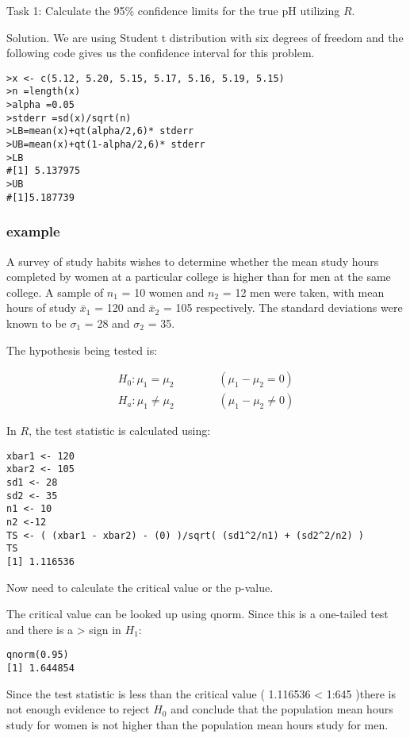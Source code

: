 \documentclass[12pt, a4paper]{report}
\theoremstyle{plain}
\theoremstyle{definition}
\theoremstyle{remark}
\begin{document}
Task 1: Calculate the 95\% confidence limits for the true pH
utilizing $R$.


Solution. We are using Student t distribution with six degrees of
freedom and the following code gives us the confidence interval
for this problem.
\begin{verbatim}
>x <- c(5.12, 5.20, 5.15, 5.17, 5.16, 5.19, 5.15)
>n =length(x)
>alpha =0.05
>stderr =sd(x)/sqrt(n)
>LB=mean(x)+qt(alpha/2,6)* stderr
>UB=mean(x)+qt(1-alpha/2,6)* stderr
>LB
#[1] 5.137975
>UB
#[1]5.187739
\end{verbatim}


\subsubsection{example}
A survey of study habits wishes to determine whether the mean
study hours completed by women at a particular college is higher
than for men at the same college. A sample of $n_1$ = 10 women and
$n_2$ = 12 men were taken, with mean hours of study $\bar{x}_1$ =
120 and $\bar{x}_2$ = 105 respectively. The standard deviations
were known to be $\sigma_1$ = 28 and $\sigma_2$ = 35.

The hypothesis being tested is:

\begin{eqnarray}
H_{0}: \mu_1 = \mu_2\qquad \qquad (\mu_1 - \mu_2= 0)\\
H_{a}: \mu_1 \neq \mu_2 \qquad \qquad (\mu_1 - \mu_2 \neq 0)
\end{eqnarray}

In $R$, the test statistic is calculated using:

\begin{verbatim}
xbar1 <- 120
xbar2 <- 105
sd1 <- 28
sd2 <- 35
n1 <- 10
n2 <-12
TS <- ( (xbar1 - xbar2) - (0) )/sqrt( (sd1^2/n1) + (sd2^2/n2) )
TS
[1] 1.116536
\end{verbatim}
Now need to calculate the critical value or the p-value.


The critical value can be looked up using qnorm. Since this is a
one-tailed test and there is a > sign in $H_1$:

\begin{verbatim}
qnorm(0.95)
[1] 1.644854
\end{verbatim}

Since the test statistic is less than the critical value ( 1.116536 < 1:645 )there is not enough evidence to reject $H_0$
and conclude that the population mean hours study for women is
not higher than the population mean hours study for men.
\end{document}

